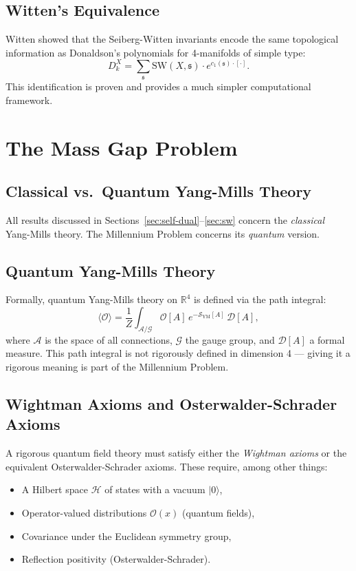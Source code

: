 \documentclass[12pt,a4paper]{amsart}
\theoremstyle{definition}
\theoremstyle{remark}
\begin{document}
\subsection{Witten's Equivalence}

Witten \cite{Witten1994} showed that the Seiberg-Witten invariants encode the same
topological information as Donaldson's polynomials for 4-manifolds of simple type:
\[
  D^X_k = \sum_{\mathfrak{s}} \mathrm{SW}(X, \mathfrak{s}) \cdot e^{c_1(\mathfrak{s}) \cdot [\cdot]}.
\]
This identification is proven and provides a much simpler computational framework.

\section{The Mass Gap Problem}
\label{sec:mass-gap}

\subsection{Classical vs.\ Quantum Yang-Mills Theory}

All results discussed in Sections~\ref{sec:self-dual}--\ref{sec:sw} concern the
\emph{classical} Yang-Mills theory. The Millennium Problem concerns its \emph{quantum}
version.

\subsection{Quantum Yang-Mills Theory}

Formally, quantum Yang-Mills theory on $\mathbb{R}^4$ is defined via the path integral:
\[
  \langle \mathcal{O} \rangle = \frac{1}{Z} \int_{\mathcal{A}/\mathcal{G}} \mathcal{O}[A] \,
  e^{-\mathcal{S}_{\mathrm{YM}}[A]} \, \mathcal{D}[A],
\]
where $\mathcal{A}$ is the space of all connections, $\mathcal{G}$ the gauge group,
and $\mathcal{D}[A]$ a formal measure. This path integral is not rigorously defined in
dimension 4 — giving it a rigorous meaning is part of the Millennium Problem.

\subsection{Wightman Axioms and Osterwalder-Schrader Axioms}

A rigorous quantum field theory must satisfy either the \emph{Wightman axioms}
\cite{StreaterWightman1964} or the equivalent Osterwalder-Schrader axioms. These
require, among other things:
\begin{itemize}[noitemsep]
  \item A Hilbert space $\mathcal{H}$ of states with a vacuum $|0\rangle$,
  \item Operator-valued distributions $\mathcal{O}(x)$ (quantum fields),
  \item Covariance under the Euclidean symmetry group,
  \item Reflection positivity (Osterwalder-Schrader).
\end{itemize}
\end{document}
